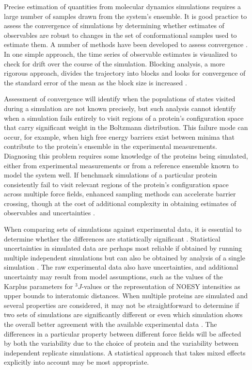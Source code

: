 \documentclass[9pt,review]{livecoms}
\begin{document}
Precise estimation of quantities from molecular dynamics simulations requires a large number of samples drawn from the system's ensemble.
It is good practice to assess the convergence of simulations by determining whether estimates of observables are robust to changes in the set of conformational samples used to estimate them.
A number of methods have been developed to assess convergence \cite{grossfield_best_2019}.
In one simple approach, the time series of observable estimates is visualized to check for drift over the course of the simulation.
Blocking analysis, a more rigorous approach, divides the trajectory into blocks and looks for convergence of the standard error of the mean as the block size is increased \cite{flyvbjerg_error_1989}.

Assessment of convergence will identify when the populations of states visited during a simulation are not known precisely, but such analysis cannot identify when a simulation fails entirely to visit regions of a protein's configuration space that carry significant weight in the Boltzmann distribution.
This failure mode can occur, for example, when high free energy barriers exist between minima that contribute to the protein's ensemble in the experimental measurements.
Diagnosing this problem requires some knowledge of the proteins being simulated, either from experimental measurements or from a reference ensemble known to model the system well.
If benchmark simulations of a particular protein consistently fail to visit relevant regions of the protein's configuration space across multiple force fields, enhanced sampling methods \cite{henin_enhanced_2022} can accelerate barrier crossing, though at the cost of additional complexity in obtaining estimates of observables and uncertainties \cite{grossfield_best_2019}.

When comparing sets of simulations against experimental data, it is essential to determine whether the differences are statistically significant \cite{van_gunsteren_validation_2018}.
Statistical uncertainties in simulated data are perhaps most reliable if obtained by running multiple independent simulations but can also be obtained by analysis of a single simulation \cite{grossfield_best_2019}.
The raw experimental data also have uncertainties, and additional uncertainty may result from model assumptions, such as the values of the Karplus parameters for $^3J$-values or the representation of NOESY intensities as upper bounds to interatomic distances.
When multiple proteins are simulated and several properties are considered, it may not be straightforward to determine if two sets of simulations are significantly different or even which simulation shows the overall better agreement with the available experimental data \cite{wassenaar_effect_2006,villa_how_2007,stroet_validation_2024}.
The differences in a particular property between different force fields will be affected by both the variability due to the choice of protein and the variability between independent replicate simulations.
A statistical approach that takes mixed effects explicitly into account \cite{stroet_validation_2024} may be most appropriate.
\end{document}
